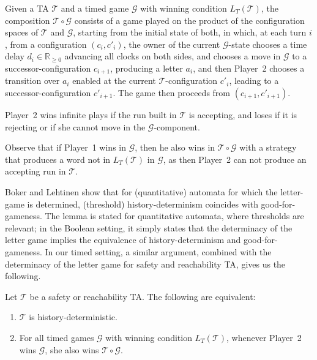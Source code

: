 \documentclass[10pt,a4paper]{amsart}
\theoremstyle{definition}
\numberwithin{equation}{section}
\newcommand{\nnreals}{{\mathbb R}_{\geq 0}}
\newcommand{\T}{\mathcal{T}}
\newcommand{\gsgame}{\mathcal{G}}
\newcommand{\comp}[2]{#2\circ #1}
\newcommand{\lang}{L_T}  %
\begin{document}
\begin{definition}[Composition]
Given a  TA $\T$ and a timed game $\gsgame$ with winning condition $\lang(\T)$, the composition $\comp{\gsgame}{\T}$ consists of a game played on the product of the configuration spaces of $\T$ and $\gsgame$, starting from the initial state of both, in which, at each turn $i$, from a configuration $(c_i,c'_i)$, 
the owner of the current $\gsgame$-state chooses a time delay $d_i\in \nnreals$ advancing all clocks on both sides, and chooses a move in $\gsgame$ to a successor-configuration $c_{i+1}$, producing a letter $a_i$,
and then Player~2 chooses a transition over $a_i$ enabled at the current $\T$-configuration $c'_i$, leading to a successor-configuration $c'_{i+1}$. The game then proceeds from $(c_{i+1},c'_{i+1})$.

Player~2 wins infinite plays if the run built in $\T$ is accepting, and loses if it is rejecting or if she cannot move in the $\gsgame$-component.

\end{definition}
Observe that if Player~1 wins in $\gsgame$, then he also wins in $\comp{\gsgame}{\T}$ with a strategy that produces a word not in $\lang(\T)$ in $\gsgame$, as then Player~2 can not produce an accepting run in $\T$.

\medskip
Boker and Lehtinen \cite[Lemma 7]{BL21} show that for (quantitative) automata for which the letter-game is determined, (threshold) history-determinism coincides with good-for-gameness. The lemma is stated for quantitative automata, where thresholds are relevant; in the Boolean setting, it simply states that the determinacy of the letter game implies the equivalence of history-determinism and good-for-gameness. In our timed setting, a similar argument, combined with the determinacy of the letter game for safety and reachability TA, gives us the following.

\begin{theorem}\label{lem:gfg2hd}
	Let $\T$ be a safety or reachability TA. The following are equivalent: %
	\begin{enumerate}
		\item\label{item:hd} $\T$ is history-deterministic.
		\item\label{item:gfg} For all timed games $\gsgame$ with winning condition $\lang(\T)$, whenever  Player~2 wins $\gsgame$, she also wins $\comp{\gsgame}{\T}$.
	\end{enumerate} 

\end{theorem}
\end{document}
